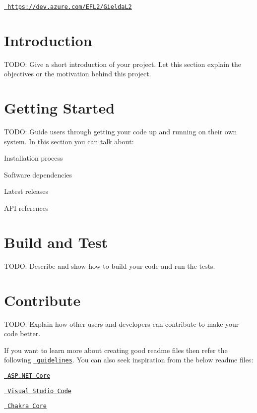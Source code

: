 \href{https://dev.azure.com/EFL2/GieldaL2}{\texttt{ https\+://dev.\+azure.\+com/\+E\+F\+L2/\+Gielda\+L2}}

\section*{Introduction}

T\+O\+DO\+: Give a short introduction of your project. Let this section explain the objectives or the motivation behind this project.

\section*{Getting Started}

T\+O\+DO\+: Guide users through getting your code up and running on their own system. In this section you can talk about\+:
\begin{DoxyEnumerate}
\item Installation process
\item Software dependencies
\item Latest releases
\item A\+PI references
\end{DoxyEnumerate}

\section*{Build and Test}

T\+O\+DO\+: Describe and show how to build your code and run the tests.

\section*{Contribute}

T\+O\+DO\+: Explain how other users and developers can contribute to make your code better.

If you want to learn more about creating good readme files then refer the following \href{https://docs.microsoft.com/en-us/azure/devops/repos/git/create-a-readme?view=azure-devops}{\texttt{ guidelines}}. You can also seek inspiration from the below readme files\+:
\begin{DoxyItemize}
\item \href{https://github.com/aspnet/Home}{\texttt{ A\+S\+P.\+N\+ET Core}}
\item \href{https://github.com/Microsoft/vscode}{\texttt{ Visual Studio Code}}
\item \href{https://github.com/Microsoft/ChakraCore}{\texttt{ Chakra Core}} 
\end{DoxyItemize}